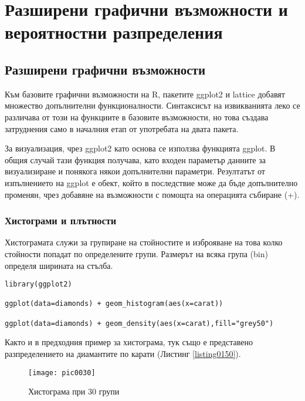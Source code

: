 \newpage
\chapter{Разширени графични възможности и вероятностни разпределения}
\label{chapter08}
\thispagestyle{empty}

\section{Разширени графични възможности}

Към базовите графични възможности на R, пакетите ggplot2 и lattice добавят множество допълнителни функционалности. Синтаксисът на извикванията леко се различава от този на функциите в базовите възможности, но това създава затруднения само в началния етап от употребата на двата пакета. 

За визуализация, чрез ggplot2 като основа се използва функцията ggplot. В общия случай тази функция получава, като входен параметър данните за визуализиране и понякога някои допълнителни параметри. Резултатът от изпълнението на ggplot е обект, който в последствие може да бъде допълнително променян, чрез добавяне на възможности с помощта на операцията събиране (+). 

\subsection{Хистограми и плътности}

Хистограмата служи за групиране на стойностите и изброяване на това колко стойности попадат по определените групи. Размерът на всяка група (bin) определя ширината на стълба. 

\begin{lstlisting}[caption=Хистограма и плътност, label=listing0150]
library(ggplot2)

ggplot(data=diamonds) + geom_histogram(aes(x=carat))

ggplot(data=diamonds) + geom_density(aes(x=carat),fill="grey50")
\end{lstlisting}

Както и в предходния пример за хистограма, тук също е представено разпределението на диамантите по карати (Листинг \ref{listing0150}).

\begin{figure}[h!]
  \centering
  \texttt{[image: pic0030]}
  \caption{Хистограма при 30 групи}
\label{figure0030}
\end{figure}
\FloatBarrier

